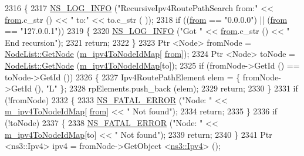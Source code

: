 \begin{DoxyCode}
2316 \{
2317   \hyperlink{group__logging_gafbd73ee2cf9f26b319f49086d8e860fb}{NS\_LOG\_INFO} (\textcolor{stringliteral}{"RecursiveIpv4RoutePathSearch from:"} << \hyperlink{lte__amc_8m_a1b4c81ff74eb1a626b5ade44c81004b3}{from}.c\_str () << \textcolor{stringliteral}{" to:"} << to.c\_str (
      ));
2318   \textcolor{keywordflow}{if} ((\hyperlink{lte__amc_8m_a1b4c81ff74eb1a626b5ade44c81004b3}{from} == \textcolor{stringliteral}{"0.0.0.0"}) || (\hyperlink{lte__amc_8m_a1b4c81ff74eb1a626b5ade44c81004b3}{from} == \textcolor{stringliteral}{"127.0.0.1"}))
2319     \{
2320       \hyperlink{group__logging_gafbd73ee2cf9f26b319f49086d8e860fb}{NS\_LOG\_INFO} (\textcolor{stringliteral}{"Got "} << \hyperlink{lte__amc_8m_a1b4c81ff74eb1a626b5ade44c81004b3}{from}.c\_str () << \textcolor{stringliteral}{" End recursion"});
2321       \textcolor{keywordflow}{return};
2322     \}
2323   Ptr <Node> fromNode = \hyperlink{classns3_1_1NodeList_a80ac09977d48d29db5c704ac8483cf6c}{NodeList::GetNode} (\hyperlink{classns3_1_1AnimationInterface_ae8061a2f8540660d0fa851e98d8c7565}{m\_ipv4ToNodeIdMap}[
      \hyperlink{lte__amc_8m_a1b4c81ff74eb1a626b5ade44c81004b3}{from}]);
2324   Ptr <Node> toNode = \hyperlink{classns3_1_1NodeList_a80ac09977d48d29db5c704ac8483cf6c}{NodeList::GetNode} (\hyperlink{classns3_1_1AnimationInterface_ae8061a2f8540660d0fa851e98d8c7565}{m\_ipv4ToNodeIdMap}[to]);
2325   \textcolor{keywordflow}{if} (fromNode->GetId () == toNode->GetId ())
2326     \{
2327       Ipv4RoutePathElement elem = \{ fromNode->GetId (), \textcolor{stringliteral}{"L"} \};
2328       rpElements.push\_back (elem);
2329       \textcolor{keywordflow}{return};
2330     \}
2331   \textcolor{keywordflow}{if} (!fromNode)
2332     \{
2333       \hyperlink{group__fatal_ga5131d5e3f75d7d4cbfd706ac456fdc85}{NS\_FATAL\_ERROR} (\textcolor{stringliteral}{"Node: "} << \hyperlink{classns3_1_1AnimationInterface_ae8061a2f8540660d0fa851e98d8c7565}{m\_ipv4ToNodeIdMap}[
      \hyperlink{lte__amc_8m_a1b4c81ff74eb1a626b5ade44c81004b3}{from}] << \textcolor{stringliteral}{" Not found"});
2334       \textcolor{keywordflow}{return};
2335     \}
2336   \textcolor{keywordflow}{if} (!toNode)
2337     \{
2338       \hyperlink{group__fatal_ga5131d5e3f75d7d4cbfd706ac456fdc85}{NS\_FATAL\_ERROR} (\textcolor{stringliteral}{"Node: "} << \hyperlink{classns3_1_1AnimationInterface_ae8061a2f8540660d0fa851e98d8c7565}{m\_ipv4ToNodeIdMap}[to] << \textcolor{stringliteral}{" Not found"});
2339       \textcolor{keywordflow}{return};
2340     \}
2341   Ptr <ns3::Ipv4> ipv4 = fromNode->GetObject <\hyperlink{classns3_1_1Ipv4}{ns3::Ipv4}> ();

\end{DoxyCode}
